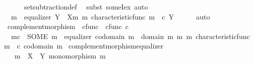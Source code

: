 \begin{isabellebody}
\ \ \ \ \isamarkupfalse%
\ set{\isacharunderscore}{\kern0pt}subtraction{\isacharunderscore}{\kern0pt}def\ \isamarkupfalse%
\ {\isacharparenleft}{\kern0pt}subst\ someI{\isacharunderscore}{\kern0pt}ex{\isacharcomma}{\kern0pt}\ auto{\isacharparenright}{\kern0pt}\isanewline
\ \ \isamarkupfalse%
\ \isamarkupfalse%
\ {\isachardoublequoteopen}{\isasymexists}\ m{\isacharprime}{\kern0pt}{\isachardot}{\kern0pt}\ \ equalizer\ {\isacharparenleft}{\kern0pt}Y\ {\isasymsetminus}\ {\isacharparenleft}{\kern0pt}X{\isacharcomma}{\kern0pt}m{\isacharparenright}{\kern0pt}{\isacharparenright}{\kern0pt}\ m{\isacharprime}{\kern0pt}\ {\isacharparenleft}{\kern0pt}characteristic{\isacharunderscore}{\kern0pt}func\ m{\isacharparenright}{\kern0pt}\ {\isacharparenleft}{\kern0pt}{\isasymf}\ {\isasymcirc}\isactrlsub c\ {\isasymbeta}\isactrlbsub Y\isactrlesub {\isacharparenright}{\kern0pt}{\isachardoublequoteclose}\isanewline
\ \ \ \ \isamarkupfalse%
\ auto\isanewline
{}\isamarkupfalse%
%
\endisatagproof
{\isafoldproof}%
%
\isadelimproof
\isanewline
%
\endisadelimproof
\isanewline
{}\isamarkupfalse%
\ complement{\isacharunderscore}{\kern0pt}morphism\ {\isacharcolon}{\kern0pt}{\isacharcolon}{\kern0pt}\ {\isachardoublequoteopen}cfunc\ {\isasymRightarrow}\ cfunc{\isachardoublequoteclose}\ {\isacharparenleft}{\kern0pt}{\isachardoublequoteopen}{\isacharunderscore}{\kern0pt}\isactrlsup c{\isachardoublequoteclose}\ {\isacharbrackleft}{\kern0pt}{}{}{}{}{\isacharbrackright}{\kern0pt}{\isacharparenright}{\kern0pt}\ \isanewline
\ \ {\isachardoublequoteopen}m\isactrlsup c\ {\isacharequal}{\kern0pt}\ {\isacharparenleft}{\kern0pt}SOME\ m{\isacharprime}{\kern0pt}{\isachardot}{\kern0pt}\ \ equalizer\ {\isacharparenleft}{\kern0pt}codomain\ m\ {\isasymsetminus}\ {\isacharparenleft}{\kern0pt}domain\ m{\isacharcomma}{\kern0pt}\ m{\isacharparenright}{\kern0pt}{\isacharparenright}{\kern0pt}\ m{\isacharprime}{\kern0pt}\ {\isacharparenleft}{\kern0pt}characteristic{\isacharunderscore}{\kern0pt}func\ m{\isacharparenright}{\kern0pt}\ {\isacharparenleft}{\kern0pt}{\isasymf}\ {\isasymcirc}\isactrlsub c\ {\isasymbeta}\isactrlbsub codomain\ m\isactrlesub {\isacharparenright}{\kern0pt}{\isacharparenright}{\kern0pt}{\isachardoublequoteclose}\isanewline
\isanewline
{}\isamarkupfalse%
\ complement{\isacharunderscore}{\kern0pt}morphism{\isacharunderscore}{\kern0pt}equalizer{\isacharcolon}{\kern0pt}\isanewline
\ \ \ {\isachardoublequoteopen}m\ {\isacharcolon}{\kern0pt}\ X\ {\isasymrightarrow}\ Y{\isachardoublequoteclose}\ {\isachardoublequoteopen}monomorphism\ m{\isachardoublequoteclose}\isanewline

\end{isabellebody}
